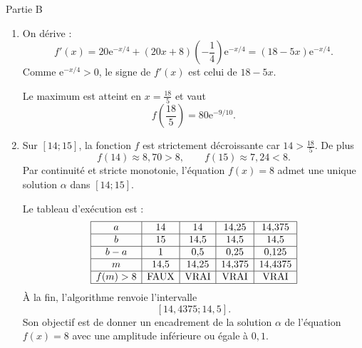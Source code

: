 \documentclass[11pt,a4paper]{article}
\newcommand{\e}{\mathrm e}
\begin{document}
\begin{correctionbox}{Partie B}
\begin{enumerate}
\item On dérive :
\[
f'(x)=20\e^{-x/4}+(20x+8)\left(-\dfrac14\right)\e^{-x/4}
=(18-5x)\e^{-x/4}.
\]
Comme $\e^{-x/4}>0$, le signe de $f'(x)$ est celui de $18-5x$.

\begin{center}
\end{center}

Le maximum est atteint en $x=\frac{18}{5}$ et vaut
\[
f\left(\dfrac{18}{5}\right)=80\e^{-9/10}.
\]

\item Sur $[14;15]$, la fonction $f$ est strictement décroissante car $14>\frac{18}{5}$. De plus
\[
f(14)\approx8{,}70>8,
\qquad
f(15)\approx7{,}24<8.
\]
Par continuité et stricte monotonie, l'équation $f(x)=8$ admet une unique solution $\alpha$ dans $[14;15]$.

Le tableau d'exécution est :
\[
\begin{array}{|c|c|c|c|c|}
\hline
 a&14&14&14{,}25&14{,}375\\ \hline
 b&15&14{,}5&14{,}5&14{,}5\\ \hline
 b-a&1&0{,}5&0{,}25&0{,}125\\ \hline
 m&14{,}5&14{,}25&14{,}375&14{,}4375\\ \hline
 f(m)>8&\text{FAUX}&\text{VRAI}&\text{VRAI}&\text{VRAI}\\ \hline
\end{array}
\]
À la fin, l'algorithme renvoie l'intervalle
\[
[14{,}4375;14{,}5].
\]
Son objectif est de donner un encadrement de la solution $\alpha$ de l'équation $f(x)=8$ avec une amplitude inférieure ou égale à $0{,}1$.
\end{enumerate}
\end{correctionbox}
\end{document}
